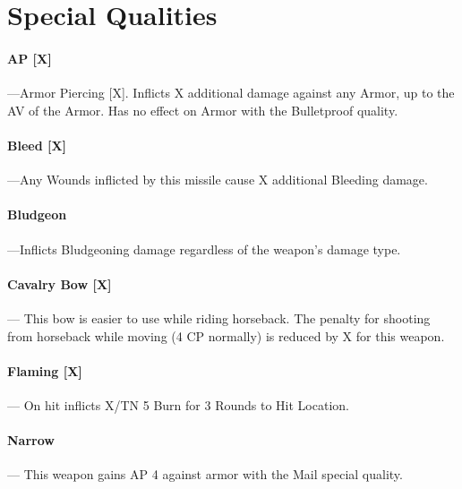 \documentclass[oneside,11pt,english]{book}
\begin{document}
\section{Special Qualities}\label{sec:Missile Special Qualities} %

\vspace{-5pt}\paragraph[AP]{\label{rangequal:AP [X]}AP [X]}---\quad Armor Piercing [X]. Inflicts X additional damage against any Armor, up to the AV of the Armor. Has no effect on Armor with the Bulletproof quality. 

\vspace{-5pt}\paragraph[Bleed]{\label{rangequal:Bleed [X]}Bleed [X]}---\quad Any Wounds inflicted by this missile cause X additional Bleeding damage. 

\vspace{-5pt}\paragraph{\label{rangequal:Bludgeon}Bludgeon}---\quad Inflicts Bludgeoning damage regardless of the weapon’s damage type. 

\vspace{-5pt}\paragraph[Cavalry Bow]{\label{rangequal:Cavalry Bow [X]}Cavalry Bow [X]}---\quad
This bow is easier to use while riding horseback. The penalty for shooting from horseback while 
moving (4 CP normally) is reduced by X for this weapon. 

\vspace{-5pt}\paragraph[Flaming]{\label{rangequal:Flaming [X]}Flaming [X]}---\quad
On hit inflicts X/TN 5 Burn for 3 Rounds to Hit Location. 

\vspace{-5pt}\paragraph{\label{rangequal:Narrow}Narrow}---\quad
This weapon gains AP 4 against armor with the Mail special quality. 
\end{document}
